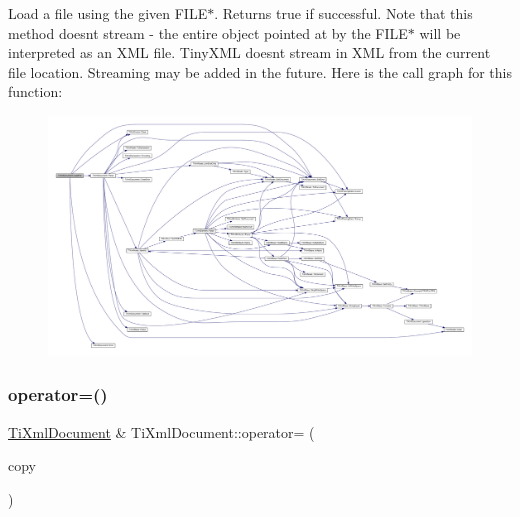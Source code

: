 Load a file using the given F\+I\+L\+E$\ast$. Returns true if successful. Note that this method doesn\textquotesingle{}t stream -\/ the entire object pointed at by the F\+I\+L\+E$\ast$ will be interpreted as an X\+ML file. Tiny\+X\+ML doesn\textquotesingle{}t stream in X\+ML from the current file location. Streaming may be added in the future. Here is the call graph for this function\+:
\nopagebreak
\begin{figure}[H]
\begin{center}
\leavevmode
\includegraphics[width=350pt]{class_ti_xml_document_a41f6fe7200864d1dca663d230caf8db6_cgraph}
\end{center}
\end{figure}
\mbox{\label{class_ti_xml_document_aa56fd4dbe8917d2033d865909e2d737e}} 
\subsubsection{\texorpdfstring{operator=()}{operator=()}}
{\footnotesize\ttfamily \hyperlink{class_ti_xml_document}{Ti\+Xml\+Document} \& Ti\+Xml\+Document\+::operator= (\begin{DoxyParamCaption}\item[{const \hyperlink{class_ti_xml_document}{Ti\+Xml\+Document} \&}]{copy }\end{DoxyParamCaption})}

